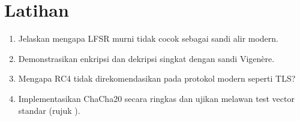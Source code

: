 \documentclass[../main.tex]{subfiles}
\begin{document}
\section{Latihan}
\begin{enumerate}
  \item Jelaskan mengapa LFSR murni tidak cocok sebagai sandi alir modern.
  \item Demonstrasikan enkripsi dan dekripsi singkat dengan sandi Vigen\`{e}re.
  \item Mengapa RC4 tidak direkomendasikan pada protokol modern seperti TLS?
  \item Implementasikan ChaCha20 secara ringkas dan ujikan melawan test vector standar (rujuk \citep{rfc8439}).
\end{enumerate}
\end{document}
